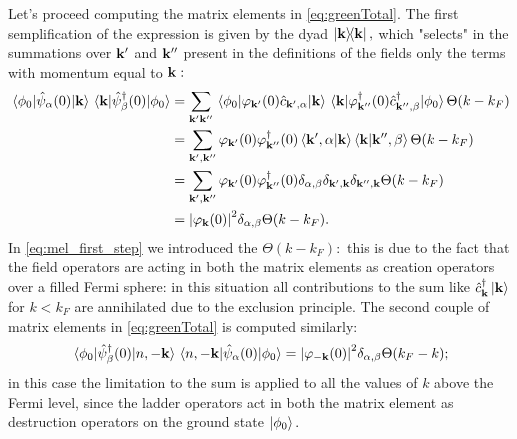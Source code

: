 \documentclass[a4paper]{article}
\begin{document}
\noindent Let's proceed computing the matrix elements in \eqref{eq:greenTotal}.
The first semplification of the expression is given by the dyad $\dyad{\vb{k}}{\vb{k}},$ which "selects" in the summations over $\vb{k}'$ and $\vb{k}''$ present in the definitions of the fields only the terms with momentum equal to $\vb{k}:$
\begin{align}
\mel{\phi_0}{\hat{\psi}_\alpha(0)}{\vb{k}}\mel{\vb{k}}{\hat{\psi}^\dag_\beta(0)}{\phi_0} &= \sum_{\vb{k}'\vb{k}''}\mel{\phi_0}{\varphi_{\vb{k}'}(0)\hat{c}_{\vb{k}',\alpha}}{\vb{k}} \mel{\vb{k}}{\varphi^\dag_{\vb{k}''}(0)\hat{c}^\dag_{\vb{k}'',\beta}}{\phi_0}\Theta(k - k_F) \label{eq:mel_first_step}\\
&=\sum_{\vb{k}',\vb{k}''} \varphi_{\vb{k}'}(0)\varphi^\dag_{\vb{k}''}(0)\braket{\vb{k}',\alpha}{\vb{k}}\braket{\vb{k}}{\vb{k}'',\beta}\Theta(k - k_F)\\
&=\sum_{\vb{k}',\vb{k}''} \varphi_{\vb{k}'}(0)\varphi^\dag_{\vb{k}''}(0) \delta_{\alpha,\beta}\delta_{\vb{k}',\vb{k}}\delta_{\vb{k}'',\vb{k}}\Theta(k - k_F)\\
&=\abs{\varphi_{\vb{k}}(0)}^2 \delta_{\alpha,\beta}\Theta(k-k_F).
\end{align}
In \eqref{eq:mel_first_step} we introduced the $\Theta(k - k_F):$ this is due to the fact that the field operators are acting in both the matrix elements as creation operators over a filled Fermi sphere: in this situation all contributions to the sum like $\hat{c}^\dag_{\vb{k}}\ket{\vb{k}}$ for $k <k_F$ are annihilated due to the exclusion principle.
The second couple of matrix elements in \eqref{eq:greenTotal} is computed similarly:
\begin{equation}
\mel{\phi_0}{\hat{\psi}^\dag_\beta(0)}{n,-\vb{k}}\mel{n,-\vb{k}}{\hat{\psi}_\alpha(0)}{\phi_0} = \abs{\varphi_{-\vb{k}}(0)}^2\delta_{\alpha,\beta} \Theta(k_F - k);
\end{equation}
in this case the limitation to the sum is applied to all the values of $k$ above the Fermi level, since the ladder operators act in both the matrix element as destruction operators on the ground state $\ket{\phi_0}.$
\end{document}
